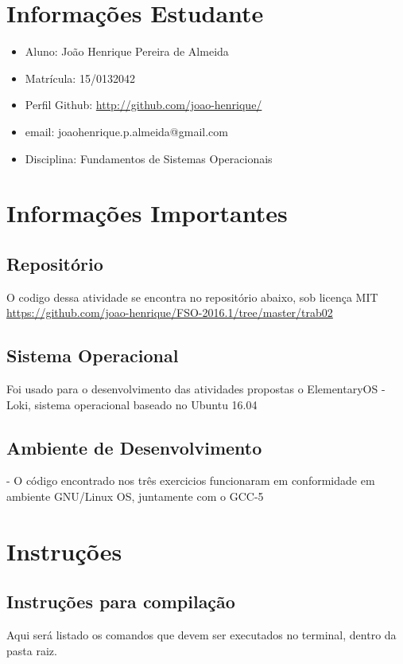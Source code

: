 \documentclass[11pt,a4paper]{article}
\begin{document}
\section{Informações Estudante}
\begin{itemize}
\item Aluno: João Henrique Pereira de Almeida
\item Matrícula: 15/0132042
\item Perfil Github: \href{http://github.com/joao-henrique/}{http://github.com/joao-henrique/}
\item email: joaohenrique.p.almeida@gmail.com
\item Disciplina: Fundamentos de Sistemas Operacionais
\end{itemize}


\section{Informações Importantes}
\subsection{Repositório}
O codigo dessa atividade se encontra no repositório abaixo, sob licença MIT
\url{https://github.com/joao-henrique/FSO-2016.1/tree/master/trab02}
\subsection{Sistema Operacional}

Foi usado para o desenvolvimento das atividades propostas o ElementaryOS - Loki, sistema operacional baseado no Ubuntu 16.04

\subsection{Ambiente de Desenvolvimento }
- O código encontrado nos três exercicios funcionaram em
conformidade em ambiente GNU/Linux OS, juntamente com o GCC-5

\section{Instruções}
\subsection{Instruções para compilação}
Aqui será listado os comandos que devem ser executados no terminal, dentro da pasta raiz.
\end{document}
